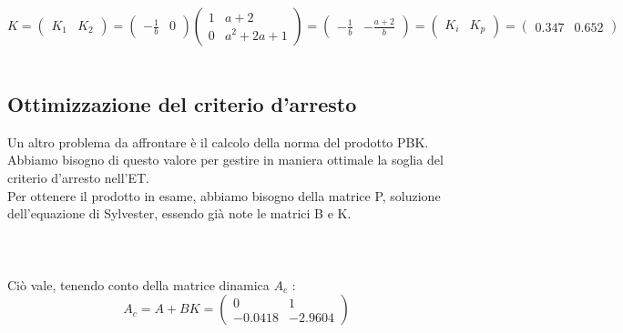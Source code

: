\documentclass[a4paper,13pt]{article}
\begin{document}
\begin{equation*}
	K=
\begin{pmatrix}

	K_{1}&K_{2}

\end{pmatrix} =                  %
\begin{pmatrix}

	-\frac{1}{b}&0

\end{pmatrix}
\begin{pmatrix}

	1&a+2\\0&a^{2}+2a+1

\end{pmatrix} =                   %
\begin{pmatrix}

	-\frac{1}{b}&-\frac{a+2}{b}

\end{pmatrix} =                    %
\begin{pmatrix}

	K_{i}&K_{p}

\end{pmatrix} =                    %
\begin{pmatrix}

	0.347&0.652

\end{pmatrix}
\end{equation*}\\
\subsection{Ottimizzazione del criterio d'arresto}
	Un altro problema da affrontare è il calcolo della norma del prodotto PBK.
	Abbiamo bisogno di questo valore per gestire in maniera ottimale la soglia del criterio d'arresto nell'ET.\\
	Per ottenere il prodotto in esame, abbiamo bisogno della matrice P, soluzione dell'equazione di Sylvester, essendo già 	note le matrici B e K.\\ \\ \\ \\
	Ciò vale, tenendo conto della matrice dinamica $A_{c}$ :\\
	
\begin{equation*}
	A_{c}=A+BK=
\begin{pmatrix}

	0&1\\-0.0418&-2.9604

\end{pmatrix}
\end{equation*} \\
	
\end{document}
